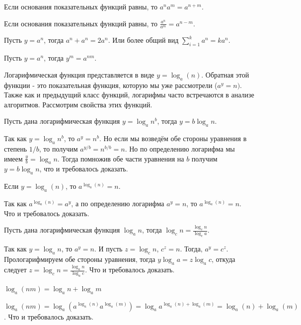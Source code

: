 \begin{definition}
Если основания показательных функций равны, то $a^na^m=a^{n+m}$.
\end{definition}
\begin{definition}
Если основания показательных функций равны, то $\frac{a^n}{a^m}=a^{n-m}$.
\end{definition}
\begin{definition}
Пусть $y=a^n$, тогда $a^n+a^n=2a^n$. Или более общий вид $\sum_{i=1}^{k}a^n=ka^n$.
\end{definition}
\begin{definition}
Пусть $y=a^n$, тогда $y^m=a^{nm}$.
\end{definition}
Логарифмическая функция представляется в виде $y=\log_a(n)$. Обратная 
этой функции - это показательная функция, которую мы уже рассмотрели 
($a^y=n)$. Также как и предыдущий класс функций, логарифмы часто встречаются в 
анализе алгоритмов. Рассмотрим свойства этих функций. 

\begin{theorem}
Пусть дана логарифмическая функция $y=\log_an^b$, тогда $y=b\log_an$.
\end{theorem}
Так как $y=\log_an^b$, то $a^y=n^b$. Но если мы возведём обе стороны уравнения
в степень $1/b$, то получим $a^{y/b}=n^{b/b}=n$. Но по определению логарифма
мы имеем $\frac{y}{b}=\log_an$. Тогда помножив обе части уравнения на $b$
получим $y=b\log_an$, что и требовалось доказать.

\begin{theorem}
Если $y=\log_a(n)$, то $a^{\log_a(n)}=n$.
\end{theorem}
Так как $a^{\log_a(n)}=a^y$, а по определению логарифма $a^y=n$, 
то $a^{\log_a(n)}=n$. Что и требовалось доказать.

\begin{theorem} 
Пусть дана логарифмическая функция $\log_an$, тогда 
$\log_cn=\frac{\log_cn}{\log_ca}$.
\end{theorem}

Так как $y=\log_an$, то $a^y=n$. И пусть $z=\log_cn$, $c^z=n$. Тогда,
$a^y=c^z$. Прологарифмируем обе стороны уравнения,
тогда $y\log_aa=z\log_ac$, откуда следует $z=\log_cn=\frac{\log_an}{\log_ac}$.
Что и требовалось доказать.

\begin{theorem}
$\log_a(nm)=\log_an+\log_am$
\end{theorem}
$\log_a(nm)=\log_a(a^{\log_a(n)}a^{\log_a(m)})=\log_aa^{\log_a(n)+\log_a(m)}=\log_a(n)+\log_a(m)$.
Что и требовалось доказать.

